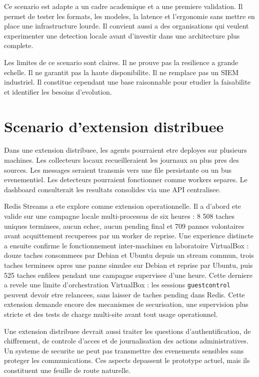 Ce scenario est adapte a un cadre academique et a une premiere validation. Il permet de tester les formats, les modeles, la latence et l'ergonomie sans mettre en place une infrastructure lourde. Il convient aussi a des organisations qui veulent experimenter une detection locale avant d'investir dans une architecture plus complete.

Les limites de ce scenario sont claires. Il ne prouve pas la resilience a grande echelle. Il ne garantit pas la haute disponibilite. Il ne remplace pas un SIEM industriel. Il constitue cependant une base raisonnable pour etudier la faisabilite et identifier les besoins d'evolution.

\section{Scenario d'extension distribuee}
Dans une extension distribuee, les agents pourraient etre deployes sur plusieurs machines. Les collecteurs locaux recueilleraient les journaux au plus pres des sources. Les messages seraient transmis vers une file persistante ou un bus evenementiel. Les detecteurs pourraient fonctionner comme workers separes. Le dashboard consulterait les resultats consolides via une API centralisee.

Redis Streams a ete explore comme extension operationnelle. Il a d'abord ete valide sur une campagne locale multi-processus de six heures : 8 508 taches uniques terminees, aucun echec, aucun pending final et 709 pannes volontaires avant acquittement recuperees par un worker de reprise. Une experience distincte a ensuite confirme le fonctionnement inter-machines en laboratoire VirtualBox : douze taches consommees par Debian et Ubuntu depuis un stream commun, trois taches terminees apres une panne simulee sur Debian et reprise par Ubuntu, puis 525 taches enfilees pendant une campagne supervisee d'une heure. Cette derniere a revele une limite d'orchestration VirtualBox : les sessions \texttt{guestcontrol} peuvent devoir etre relancees, sans laisser de taches pending dans Redis. Cette extension demande encore des mecanismes de securisation, une supervision plus stricte et des tests de charge multi-site avant tout usage operationnel.

Une extension distribuee devrait aussi traiter les questions d'authentification, de chiffrement, de controle d'acces et de journalisation des actions administratives. Un systeme de securite ne peut pas transmettre des evenements sensibles sans proteger les communications. Ces aspects depassent le prototype actuel, mais ils constituent une feuille de route naturelle.

